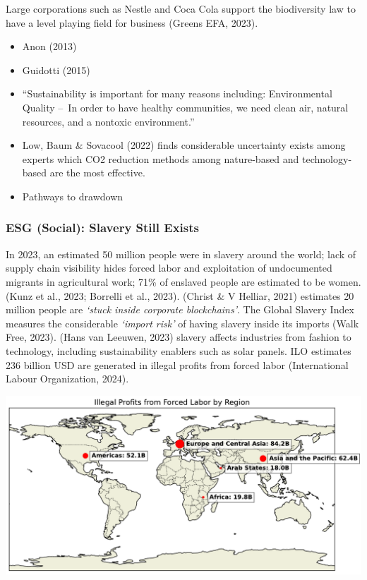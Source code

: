 \documentclass[
  letterpaper,
  DIV=11,
  numbers=noendperiod]{scrartcl}
\begin{document}
Large corporations such as Nestle and Coca Cola support the biodiversity
law to have a level playing field for business (Greens EFA, 2023).

\begin{itemize}
\item
  Anon (2013)
\item
  Guidotti (2015)
\item
  ``Sustainability is important for many reasons including:
  Environmental Quality --~In order to have healthy communities, we need
  clean air, natural resources, and a nontoxic environment.''
\item
  Low, Baum \& Sovacool (2022) finds considerable uncertainty exists
  among experts which CO2 reduction methods among nature-based and
  technology-based are the most effective.
\item
  Pathways to drawdown
\end{itemize}

\subsubsection{ESG (Social): Slavery Still
Exists}\label{esg-social-slavery-still-exists}

In 2023, an estimated 50 million people were in slavery around the
world; lack of supply chain visibility hides forced labor and
exploitation of undocumented migrants in agricultural work; 71\% of
enslaved people are estimated to be women. (Kunz et al., 2023; Borrelli
et al., 2023). (Christ \& V Helliar, 2021) estimates 20 million people
are \emph{`stuck inside corporate blockchains'}. The Global Slavery
Index measures the considerable \emph{`import risk'} of having slavery
inside its imports (Walk Free, 2023). (Hans van Leeuwen, 2023) slavery
affects industries from fashion to technology, including sustainability
enablers such as solar panels. ILO estimates 236 billion USD are
generated in illegal profits from forced labor (International Labour
Organization, 2024).

\includegraphics{_thesis_files/figure-pdf/cell-57-output-1.pdf}
\end{document}
